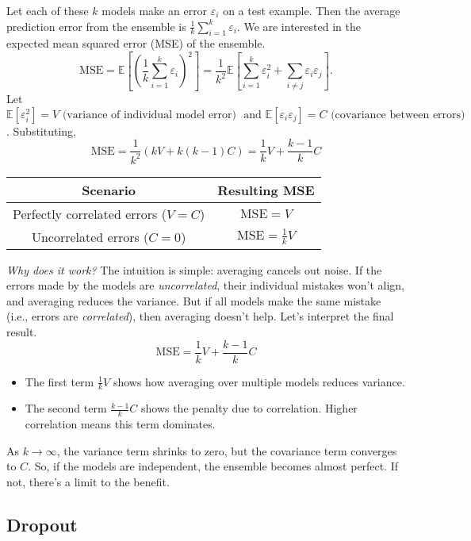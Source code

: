 Let each of these \( k \) models make an error \( \varepsilon_i \) on a test example. Then the average prediction error from the ensemble is
\(
\frac{1}{k} \sum_{i=1}^k \varepsilon_i
\). 
We are interested in the expected mean squared error (MSE) of the ensemble.
\[
\text{MSE} = \mathbb{E}\left[\left( \frac{1}{k} \sum_{i=1}^k \varepsilon_i \right)^2\right] = \frac{1}{k^2} \mathbb{E} \left[ \sum_{i=1}^k \varepsilon_i^2 + \sum_{i \ne j} \varepsilon_i \varepsilon_j \right]. 
\]
Let
\(
\mathbb{E}[\varepsilon_i^2] = V  \text{ (variance of individual model error) } \text{ and } \mathbb{E}[\varepsilon_i \varepsilon_j] = C  \text{ (covariance between errors) }
\).     
Substituting,
\[
\text{MSE} = \frac{1}{k^2} \left( kV + k(k-1)C \right)
= \frac{1}{k} V + \frac{k-1}{k} C
\]

\begin{center}
\begin{tabular}{|c|c|}
\hline
\textbf{Scenario} & \textbf{Resulting MSE} \\
\hline
Perfectly correlated errors (\(V = C\)) & \( \text{MSE} = V \) \\
Uncorrelated errors (\(C = 0\)) & \( \text{MSE} = \frac{1}{k} V \) \\
\hline
\end{tabular}
\end{center}

\textit{Why does it work?} The intuition is simple: averaging cancels out noise. If the errors made by the models are \textit{uncorrelated}, their individual mistakes won't align, and averaging reduces the variance. But if all models make the same mistake (i.e., errors are \textit{correlated}), then averaging doesn't help. Let’s interpret the final result. 
\[
\text{MSE} = \frac{1}{k} V + \frac{k-1}{k} C
\]
\begin{itemize}
    \item The first term \( \frac{1}{k} V \) shows how averaging over multiple models reduces variance.
    \item The second term \( \frac{k-1}{k} C \) shows the penalty due to correlation. Higher correlation means this term dominates.
\end{itemize}
As \( k \to \infty \), the variance term shrinks to zero, but the covariance term converges to \( C \). So, if the models are independent, the ensemble becomes almost perfect. If not, there's a limit to the benefit.

\subsection{Dropout}

